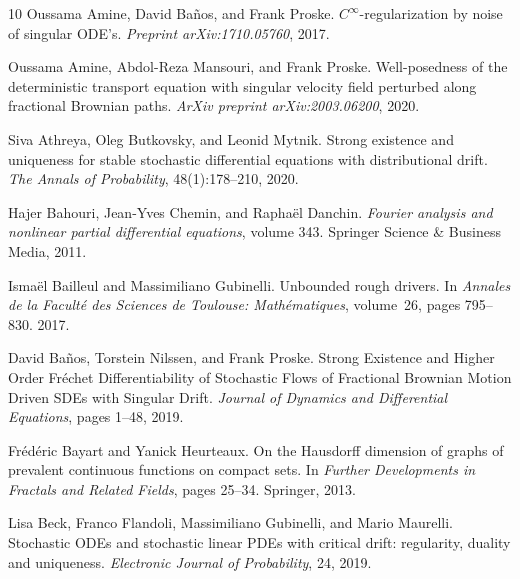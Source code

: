 \documentclass[10pt]{article}
\newcommand{\tmtextit}[1]{{\itshape{#1}}}
\begin{document}
\begin{thebibliography}{10}
  Oussama Amine, David Ba{\~n}os, and  Frank Proske.
  {\newblock}$C^{\infty}$-regularization by noise of singular ODE's.
  {\newblock}\tmtextit{Preprint arXiv:1710.05760}, 2017.{\newblock}
  
  Oussama Amine, Abdol-Reza Mansouri, and  Frank Proske.
  {\newblock}Well-posedness of the deterministic transport equation with
  singular velocity field perturbed along fractional Brownian paths.
  {\newblock}\tmtextit{ArXiv preprint arXiv:2003.06200}, 2020.{\newblock}
  
  Siva Athreya, Oleg Butkovsky, and  Leonid Mytnik.
  {\newblock}Strong existence and uniqueness for stable stochastic
  differential equations with distributional drift. {\newblock}\tmtextit{The
  Annals of Probability}, 48(1):178--210, 2020.{\newblock}
  
  Hajer Bahouri, Jean-Yves Chemin, and  Rapha{\"e}l
  Danchin. {\newblock}\tmtextit{Fourier analysis and nonlinear partial
  differential equations},  volume  343. {\newblock}Springer Science \&
  Business Media, 2011.{\newblock}
  
  Isma{\"e}l Bailleul  and  Massimiliano Gubinelli.
  {\newblock}Unbounded rough drivers. {\newblock}In \tmtextit{Annales de la
  Facult{\'e} des Sciences de Toulouse: Math{\'e}matiques},  volume~26,  pages
  795--830. 2017.{\newblock}
  
  David Ba{\~n}os, Torstein Nilssen, and  Frank Proske.
  {\newblock}Strong Existence and Higher Order Fr{\'e}chet Differentiability
  of Stochastic Flows of Fractional Brownian Motion Driven SDEs with Singular
  Drift. {\newblock}\tmtextit{Journal of Dynamics and Differential Equations},
  pages  1--48, 2019.{\newblock}
  
  Fr{\'e}d{\'e}ric Bayart  and  Yanick Heurteaux.
  {\newblock}On the Hausdorff dimension of graphs of prevalent continuous
  functions on compact sets. {\newblock}In \tmtextit{Further Developments in
  Fractals and Related Fields},  pages  25--34. Springer, 2013.{\newblock}
  
  Lisa Beck, Franco Flandoli, Massimiliano Gubinelli, and 
  Mario Maurelli. {\newblock}Stochastic ODEs and stochastic linear PDEs with
  critical drift: regularity, duality and uniqueness.
  {\newblock}\tmtextit{Electronic Journal of Probability}, 24,
  2019.{\newblock}
  

\end{thebibliography}
\end{document}
